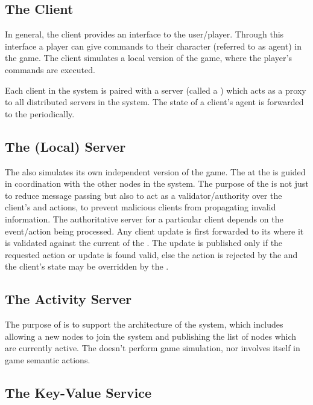 \subsection{The Client}

	In general, the client provides an interface to the user/player. Through this interface a player can give commands to their character (referred to as agent) in the game. The client simulates a local version of the game, where the player's commands are executed. %
	
	Each client in the system is paired with a server (called a \localServer) which acts as a proxy to all distributed servers in the system. The state of a client's agent is forwarded to the \localServer periodically. 
	
\subsection{The (Local) Server}

	The \localServer also simulates its own independent version of the game. The \gamestate at the \localServer is guided in coordination with the other nodes in the system. The purpose of the \localServer is not just to reduce message passing but also to act as a validator/authority over the client's \gamestate and actions, to prevent malicious clients from propagating invalid information. The authoritative server for a particular client depends on the event/action being processed. Any client update is first forwarded to its \localServer where it is validated against the current \gamestate of the \localServer. The update is published only if the requested action or update is found valid, else the action is rejected by the \localServer and the client's state may be overridden by the \localServer. 
	
\subsection{The Activity Server}

	The purpose of \activityServer is to support the architecture of the system, which includes allowing a new nodes to join the system and publishing the list of nodes which are currently active. The \activityServer doesn't perform game simulation, nor involves itself in game semantic actions.

\subsection{The Key-Value Service}

